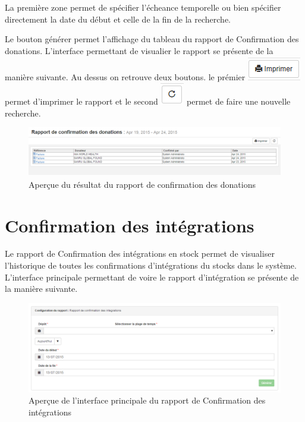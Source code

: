 \documentclass[12pt,a4paper]{report}
\begin{document}
La première zone permet de spécifier l'écheance temporelle  ou bien spécifier directement la date du début et celle de la fin de la recherche. 

Le bouton générer permet l'affichage du tableau du rapport de Confirmation des donations. L'interface permettant de visualier le rapport se présente de la manière suivante. Au dessus on retrouve deux boutons. le prémier 
\includegraphics[scale=0.7]{pic/Print.png} permet d'imprimer le rapport et le second \includegraphics[scale=0.7]{pic/refresh.png} permet de faire une nouvelle recherche.

\begin{figure}[h]
\begin{center}
\includegraphics[width=12cm]{pic/RapConfDon.png}
\end{center}
\caption{Aperçue du résultat du rapport de confirmation des donations}
\label{Aperçue du résultat du rapport de confirmation des donations}
\end{figure}

\newpage
\section{Confirmation des intégrations}
Le rapport de Confirmation des intégrations en stock permet de visualiser l'historique de toutes les confirmations d'intégrations du stocks dans le système. L'interface principale permettant de voire le rapport d'intégration se présente de la manière suivante. 

\begin{figure}[h]
\begin{center}
\includegraphics[width=14cm]{pic/StockIntegration.png}
\end{center}
\caption{Aperçue de l'interface principale du rapport de Confirmation des intégrations}
\label{Aperçue de l'interface principale du rapport de Confirmation des intégrations}
\end{figure}
\end{document}
